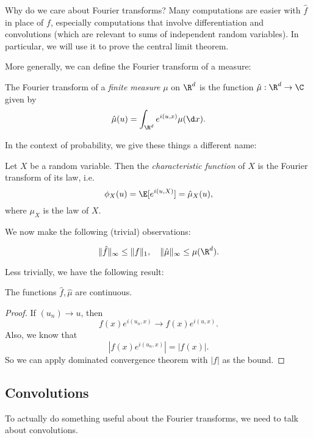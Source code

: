 \documentclass[a4paper]{article}
\begin{document}
Why do we care about Fourier transforms? Many computations are easier with $\hat{f}$ in place of $f$, especially computations that involve differentiation and convolutions (which are relevant to sums of independent random variables). In particular, we will use it to prove the central limit theorem.

More generally, we can define the Fourier transform of a measure:

\begin{defi}
  The Fourier transform of a \emph{finite measure} $\mu$ on $\R^d$ is the function $\hat{\mu}: \R^d \to \C$ given by
  \[
    \hat{\mu}(u) = \int_{\R^d} e^{i(u, x)} \mu(\d x).
  \]
\end{defi}

In the context of probability, we give these things a different name:
\begin{defi}
  Let $X$ be a random variable. Then the \emph{characteristic function} of $X$ is the Fourier transform of its law, i.e.
  \[
    \phi_X(u) = \E[e^{i(u, X)}] = \hat{\mu}_X(u),
  \]
  where $\mu_X$ is the law of $X$.
\end{defi}

We now make the following (trivial) observations:
\begin{prop}
  \[
    \|\hat{f}\|_\infty \leq \|f\|_1, \quad \|\hat{\mu}\|_\infty \leq \mu(\R^d).
  \]
\end{prop}

Less trivially, we have the following result:
\begin{prop}
  The functions $\hat{f}, \hat{\mu}$ are continuous.
\end{prop}

\begin{proof}
  If $(u_n) \to u$, then
  \[
    f(x) e^{i(u_n, x)} \to f(x) e^{i(u, x)}.
  \]
  Also, we know that
  \[
    |f(x) e^{i(u_n, x)}| = |f(x)|.
  \]
  So we can apply dominated convergence theorem with $|f|$ as the bound.
\end{proof}

\subsection{Convolutions}
To actually do something useful about the Fourier transforms, we need to talk about convolutions.
\end{document}
